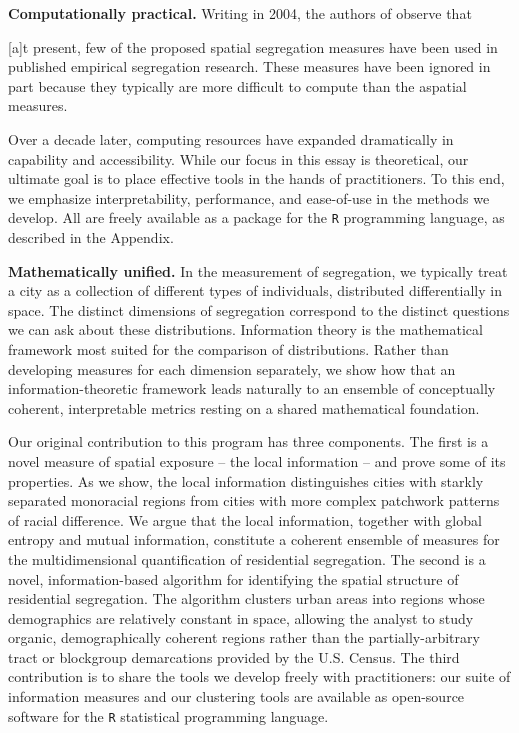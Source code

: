 \documentclass[english]{scrartcl}
\begin{document}
	\textbf{Computationally practical.} Writing in 2004, the authors of \cite{Reardon2004} observe that 
	\begin{displayquote}
		
		[a]t present, few of the proposed spatial segregation measures have been used in published empirical segregation research. These measures have been ignored in part because they typically are more difficult to compute than the aspatial measures.
	
	\end{displayquote}
	Over a decade later, computing resources have expanded dramatically in capability and accessibility. While our focus in this essay is theoretical, our ultimate goal is to place effective tools in the hands of practitioners. To this end, we emphasize interpretability, performance, and ease-of-use in the methods we develop. All are freely available as a package for the \texttt{R} programming language, as described in the Appendix. 

	\textbf{Mathematically unified.} In the measurement of segregation, we typically treat a city as a collection of different types of individuals, distributed differentially in space. The distinct dimensions of segregation correspond to the distinct questions we can ask about these distributions. Information theory is the mathematical framework most suited for the comparison of distributions. Rather than developing  measures for each dimension separately, we show how that an information-theoretic framework leads naturally to an ensemble of conceptually coherent, interpretable metrics resting on a shared mathematical foundation. 

	Our original contribution to this program has three components. The first is a novel measure of spatial exposure -- the local information -- and prove some of its properties. As we show, the local information distinguishes cities with starkly separated monoracial regions from cities with more complex patchwork patterns of racial difference. We argue that the local information, together with global entropy and mutual information, constitute a coherent ensemble of measures for the multidimensional quantification of residential segregation. The second is a novel, information-based algorithm for identifying the spatial structure of residential segregation. The algorithm clusters urban areas into regions whose demographics are relatively constant in space, allowing the analyst to study organic, demographically coherent regions rather than the partially-arbitrary tract or blockgroup demarcations provided by the U.S. Census. The third contribution is to share the tools we develop freely with practitioners: our suite of information measures and our clustering tools are available as open-source software for the \texttt{R} statistical programming language. 
\end{document}
